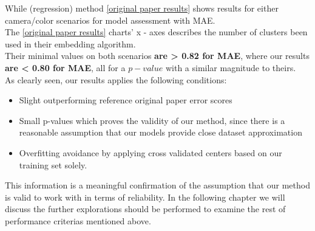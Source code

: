 While \cite{prep_color} (regression) method
\ref{original paper results} shows results for either camera/color scenarios for model assessment with MAE. \\
The \ref{original paper results} charts' x - axes describes the number of clusters been used in their embedding algorithm. \\
Their minimal values on both scenarios\textbf{ are > 0.82 for MAE}, where our results \textbf{ are < 0.80 for MAE}, all for a $p - value$ with a similar magnitude to theirs. \\
As clearly seen, our results applies the following conditions:
\begin{itemize}
	\item Slight outperforming reference original paper error scores
	\item Small p-values which proves the validity of our method, since there is a reasonable assumption that our models provide close dataset approximation
	\item Overfitting avoidance by applying cross validated centers based on our training set solely.
\end{itemize}

This information is a meaningful confirmation of the assumption that our method is valid to work with in terms of reliability. In the following chapter we will discuss the further explorations should be performed to examine the rest of performance criterias mentioned above.
